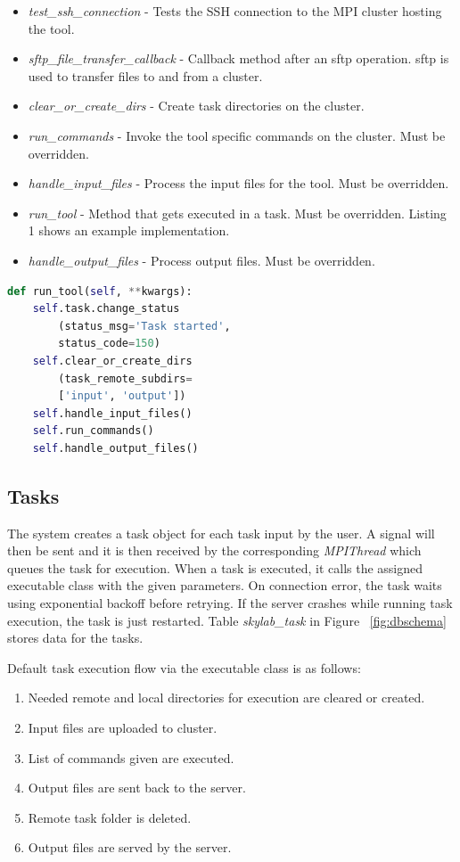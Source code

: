 \begin{itemize}
	\item \textit{test\_ssh\_connection} - Tests the SSH connection to the MPI cluster hosting the tool.
	\item \textit{sftp\_file\_transfer\_callback} - Callback method after an sftp operation. sftp is used to transfer files to and from a cluster.
	\item \textit{clear\_or\_create\_dirs} - Create task directories on the cluster.
	\item \textit{run\_commands} - Invoke the tool specific commands on the cluster. Must be overridden.
	\item \textit{handle\_input\_files} - Process the input files for the tool. Must be overridden.
	\item \textit{run\_tool} - Method that gets executed in a task. Must be overridden. Listing 1 shows an example implementation.
	\item \textit{handle\_output\_files} - Process output files. Must be overridden.
\end{itemize}

\begin{lstlisting}[label=runtool, language=Python, frame=single, caption=run\_tool method implementation for GAMESS.]
def run_tool(self, **kwargs):
    self.task.change_status
    	(status_msg='Task started',
    	status_code=150)
    self.clear_or_create_dirs
    	(task_remote_subdirs=
    	['input', 'output'])
    self.handle_input_files()
    self.run_commands()
    self.handle_output_files()
\end{lstlisting}


\subsection{Tasks} 
The system creates a task object for each task input by the user. A signal will then be sent and it is then received by the corresponding \textit{MPIThread} which queues the task for execution. When a task is executed, it calls the assigned executable class with the given parameters. On connection error, the task waits using exponential backoff before retrying. If the server crashes while running task execution, the task is just restarted. Table \textit{skylab\_task}  in Figure ~\ref{fig:dbschema} stores data for the tasks.				
		
Default task execution flow via the executable class is as follows:			
	\begin{enumerate}
		\item  Needed remote and local directories for execution are cleared or created.
		\item  Input files are uploaded to cluster.
		\item  List of commands given are executed.
		\item  Output files are sent back to the server.
		\item  Remote task folder is deleted.
		\item  Output files are served by the server.
	\end{enumerate}	

